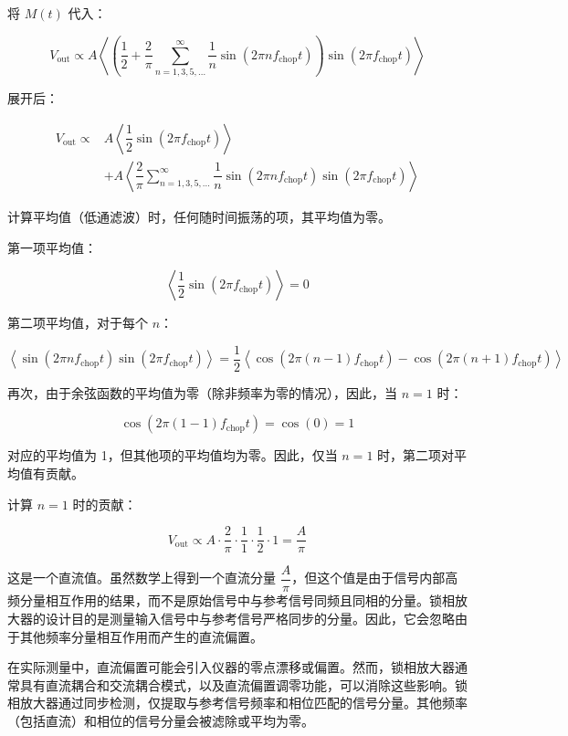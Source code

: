 将 \( M(t) \) 代入：

\[
V_{\text{out}} \propto A \left\langle \left( \dfrac{1}{2} + \dfrac{2}{\pi} \sum_{n=1,3,5,\dots}^{\infty} \dfrac{1}{n} \sin(2\pi n f_{\text{chop}} t) \right) \sin(2\pi f_{\text{chop}} t) \right\rangle
\]

展开后：

\[
\begin{aligned}
	V_{\text{out}} \propto & A \left\langle \dfrac{1}{2} \sin(2\pi f_{\text{chop}} t) \right\rangle \\
	& + A \left\langle \dfrac{2}{\pi} \sum_{n=1,3,5,\dots}^{\infty} \dfrac{1}{n} \sin(2\pi n f_{\text{chop}} t) \sin(2\pi f_{\text{chop}} t) \right\rangle
\end{aligned}
\]

计算平均值（低通滤波）时，任何随时间振荡的项，其平均值为零。

第一项平均值：

\[
\left\langle \dfrac{1}{2} \sin(2\pi f_{\text{chop}} t) \right\rangle = 0
\]

第二项平均值，对于每个 \( n \)：

\[
\left\langle \sin(2\pi n f_{\text{chop}} t) \sin(2\pi f_{\text{chop}} t) \right\rangle = \dfrac{1}{2} \left\langle \cos(2\pi (n - 1) f_{\text{chop}} t) - \cos(2\pi (n + 1) f_{\text{chop}} t) \right\rangle
\]

再次，由于余弦函数的平均值为零（除非频率为零的情况），因此，当 \( n = 1 \) 时：

\[
\cos(2\pi (1 - 1) f_{\text{chop}} t) = \cos(0) = 1
\]

对应的平均值为 1，但其他项的平均值均为零。因此，仅当 \( n = 1 \) 时，第二项对平均值有贡献。

计算 \( n = 1 \) 时的贡献：

\[
V_{\text{out}} \propto A \cdot \dfrac{2}{\pi} \cdot \dfrac{1}{1} \cdot \dfrac{1}{2} \cdot 1 = \dfrac{A}{\pi}
\]

这是一个直流值。虽然数学上得到一个直流分量 \( \dfrac{A}{\pi} \)，但这个值是由于信号内部高频分量相互作用的结果，而不是原始信号中与参考信号同频且同相的分量。锁相放大器的设计目的是测量输入信号中与参考信号严格同步的分量。因此，它会忽略由于其他频率分量相互作用而产生的直流偏置。

在实际测量中，直流偏置可能会引入仪器的零点漂移或偏置。然而，锁相放大器通常具有直流耦合和交流耦合模式，以及直流偏置调零功能，可以消除这些影响。锁相放大器通过同步检测，仅提取与参考信号频率和相位匹配的信号分量。其他频率（包括直流）和相位的信号分量会被滤除或平均为零。

